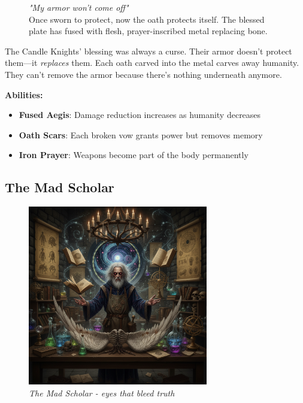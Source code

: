 \documentclass[11pt,a4paper,twoside]{book}
\begin{document}
\begin{figure}
    \centering
    \begin{tcolorbox}[horrorbox={}, boxrule=2pt, width=\linewidth]
    \textit{"My armor won't come off"}\\
    \vspace{0.5em}
    Once sworn to protect, now the oath protects itself. The blessed plate has fused with flesh, prayer-inscribed metal replacing bone.
    \end{tcolorbox}
\end{figure}

The Candle Knights' blessing was always a curse. Their armor doesn't protect them—it \textit{replaces} them. Each oath carved into the metal carves away humanity. They can't remove the armor because there's nothing underneath anymore.

\textbf{Abilities:}
\begin{itemize}
    \item \textbf{Fused Aegis}: Damage reduction increases as humanity decreases
    \item \textbf{Oath Scars}: Each broken vow grants power but removes memory
    \item \textbf{Iron Prayer}: Weapons become part of the body permanently
\end{itemize}

\subsection{The Mad Scholar}

\begin{figure}[h]
\centering
\includegraphics[width=0.7\textwidth]{images/mad_scholar_2025-09-03T22-30-39-545Z_1.png}
\caption*{\textit{The Mad Scholar - eyes that bleed truth}}
\end{figure}
\end{document}
